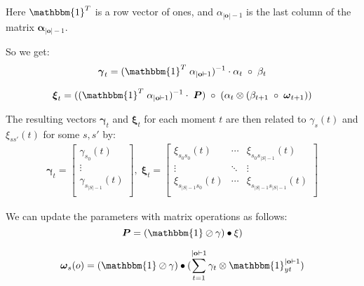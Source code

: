 Here $\mathbbm{1}^T$ is a row vector of ones, and $\alpha_{|\mathbf{o}|-1}$ is the last column of the matrix $\boldsymbol{\alpha}_{|\mathbf{o}|-1}$.

So we get:
\begin{equation}
    \boldsymbol{\gamma}_t = (\mathbbm{1}^T \; \alpha_{|\mathbf{o}|-1})^{-1} \cdot \alpha_t \; \circ \; \beta_t
    \label{eq:equation23}
\end{equation}

\begin{equation}
    \boldsymbol{\xi}_t = ((\mathbbm{1}^T \; \alpha_{|\mathbf{o}|-1})^{-1} \cdot \; \boldsymbol{P}) \; \circ \;(\alpha_t \otimes (\beta_{t+1} \; \circ \; \boldsymbol{\omega}_{t+1}))
    \label{eq:equation24}
\end{equation}

The resulting vectors $\boldsymbol{\gamma}_t$ and $\boldsymbol{\xi}_t$ for each moment $t$ are then related to $\gamma_s(t)$ and $\xi_{ss'}(t)$ for some $s, s'$ by:
\begin{align}
    \boldsymbol{\gamma}_t = \begin{bmatrix}
        \gamma_{s_0}(t)       \\
        \vdots                \\
        \gamma_{s_{|S|-1}}(t) \\
    \end{bmatrix}, \;
    \boldsymbol{\xi}_t = \begin{bmatrix}
        \xi_{s_0 s_0}(t)       & \cdots & \xi_{s_0 s_{|S|-1}}(t)             \\
        \vdots                 & \ddots & \vdots                             \\
        \xi_{s_{|S|-1}s_0}(t) & \cdots & \xi_{s_{|S|-1}s_{|S|-1}}(t) \\
    \end{bmatrix}
\end{align}

We can update the parameters with matrix operations as follows:
\begin{equation}
    \boldsymbol{P} = (\mathbbm{1} \oslash \gamma) \bullet \xi)
    \label{eq:equation25}
\end{equation}

\begin{equation}
    \boldsymbol{\omega}_s(o) = (\mathbbm{1} \oslash \gamma) \bullet (\sum_{t=1}^{|\mathbf{o}|-1} \gamma_t \otimes \mathbbm{1}_{yt}^{|\mathbf{o}|-1})
    \label{eq:equation26}
\end{equation}

